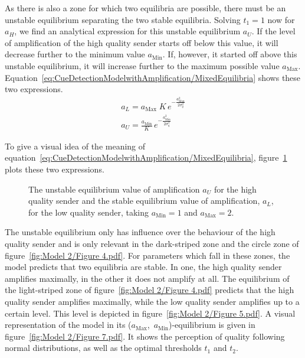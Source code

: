 \documentclass[a4paper,12pt]{article}
\numberwithin{equation}{section}
\begin{document}
As there is also a zone for which two equilibria are possible, there must be an unstable equilibrium separating the two stable equilibria. Solving $t_{1}=1$ now for $a_{H}$, we find an analytical expression for this unstable equilibrium $a_{U}$. If the level of amplification of the high quality sender starts off below this value, it will decrease further to the minimum value $a_{\text{Min}}$. If, however, it started off above this unstable equilibrium, it will increase further to the maximum possible value $a_{\text{Max}}$. Equation~\ref{eq:CueDetectionModelwithAmplification/MixedEquilibria} shows these two expressions.
\vspace{-2mm}
\begin{subequations}
\label{eq:CueDetectionModelwithAmplification/MixedEquilibria}
\begin{gather}
a_{L}= a_{\text{Max}} \; K \, e^{-\frac{a_{\text{Max}}^{2}}{2 \sigma_{q}^{2}}}\\
a_{U} = \frac{a_{\text{Min}}}{K} \, e^{-\frac{a_{\text{Min}}^{2}}{2 \sigma_{q}^{2}}}
\end{gather}
\end{subequations}

To give a visual idea of the meaning of equation~\ref{eq:CueDetectionModelwithAmplification/MixedEquilibria}, figure~\ref{fig:Model 2/Figure 56} plots these two expressions.

\begin{figure}[h]
\captionsetup{width=380pt}
\begin{center}
\hspace{10mm}
\caption{The unstable equilibrium value of amplification $a_{U}$ for the high quality sender and the stable equilibrium value of amplification, $a_{L}$, for the low quality sender, taking $a_{\text{Min}}=1$ and $a_{\text{Max}}=2$.}
\label{fig:Model 2/Figure 56}
\end{center}
\end{figure}

The unstable equilibrium only has influence over the behaviour of the high quality sender and is only relevant in the dark-striped zone and the circle zone of figure~\ref{fig:Model 2/Figure 4.pdf}. For parameters which fall in these zones, the model predicts that two equilibria are stable. In one, the high quality sender amplifies maximally, in the other it does not amplify at all. The equilibrium of the light-striped zone of figure~\ref{fig:Model 2/Figure 4.pdf} predicts that the high quality sender amplifies maximally, while the low quality sender amplifies up to a certain level. This level is depicted in figure~\ref{fig:Model 2/Figure 5.pdf}. A visual representation of the model in its ($a_{\text{Max}}$,~$a_{\text{Min}}$)-equilibrium is given in figure~\ref{fig:Model 2/Figure 7.pdf}. It shows the perception of quality following normal distributions, as well as the optimal thresholds $t_{1}$ and $t_{2}$.
\end{document}

